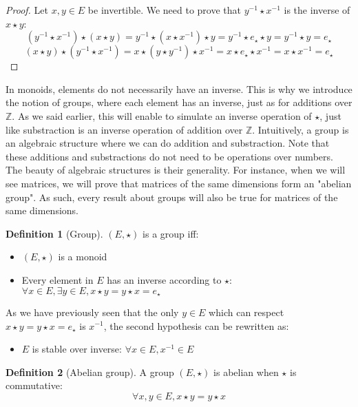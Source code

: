\documentclass{article}
\theoremstyle{definition}
\newtheorem{definition}{Definition}[section]
\theoremstyle{remark}
\theoremstyle{example}
\begin{document}
\begin{proof}
		Let $x, y \in E$ be invertible. We need to prove that $y^{-1} \star x^{-1}$ is the inverse of $x \star y$:
				$$(y^{-1} \star x^{-1}) \star (x \star y) = y^{-1} \star (x \star x^{-1}) \star y = y^{-1} \star e_\star \star y = y^{-1} \star y = e_\star$$
				$$(x \star y) \star (y^{-1} \star x^{-1}) = x \star (y \star y^{-1}) \star x^{-1} = x \star e_\star \star x^{-1} = x \star x^{-1} = e_\star$$
\end{proof}

In monoids, elements do not necessarily have an inverse. This is why we introduce the notion of groups, where each element has an inverse, just as for additions over $\mathbb{Z}$. As we said earlier, this will enable to simulate an inverse operation of $\star$, just like substraction is an inverse operation of addition over $\mathbb{Z}$. Intuitively, a group is an algebraic structure where we can do addition and substraction. Note that these additions and substractions do not need to be operations over numbers. The beauty of algebraic structures is their generality. For instance, when we will see matrices, we will prove that matrices of the same dimensions form an "abelian group". As such, every result about groups will also be true for matrices of the same dimensions. 

\begin{definition}[Group]
		$(E, \star)$ is a group iff:
		\begin{itemize}
				\item  $(E, \star)$ is a monoid
				\item Every element in $E$ has an inverse according to $\star$: $\forall x \in E, \exists y \in E, x \star y = y \star x = e_\star$
		\end{itemize}
		As we have previously seen that the only $y \in E$ which can respect $x \star y = y \star x = e_\star$ is $x^{-1}$, the second hypothesis can be rewritten as:
		\begin{itemize}
				\item $E$ is stable over inverse: $\forall x \in E, x^{-1} \in E$
		\end{itemize}
\end{definition}

\begin{definition}[Abelian group]
		A group $(E, \star)$ is abelian when $\star$ is commutative:
				$$\forall x, y \in E, x \star y = y \star x$$
\end{definition}
\end{document}
